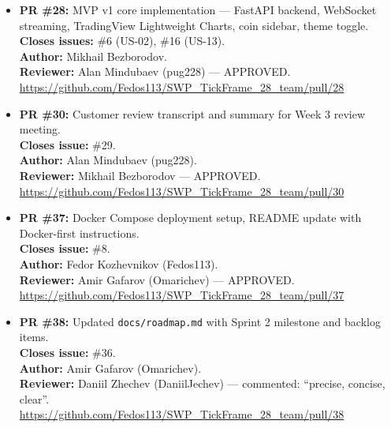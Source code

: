 \documentclass[11pt,a4paper]{article}
\begin{document}
\begin{itemize}[leftmargin=*]
    \item \textbf{PR \#28:} MVP v1 core implementation — FastAPI backend, WebSocket streaming, TradingView Lightweight Charts, coin sidebar, theme toggle. \\
          \textbf{Closes issues:} \#6 (US-02), \#16 (US-13). \\
          \textbf{Author:} Mikhail Bezborodov. \\
          \textbf{Reviewer:} Alan Mindubaev (pug228) — APPROVED. \\
          \url{https://github.com/Fedos113/SWP_TickFrame_28_team/pull/28}

    \item \textbf{PR \#30:} Customer review transcript and summary for Week 3 review meeting. \\
          \textbf{Closes issue:} \#29. \\
          \textbf{Author:} Alan Mindubaev (pug228). \\
          \textbf{Reviewer:} Mikhail Bezborodov — APPROVED. \\
          \url{https://github.com/Fedos113/SWP_TickFrame_28_team/pull/30}

    \item \textbf{PR \#37:} Docker Compose deployment setup, README update with Docker-first instructions. \\
          \textbf{Closes issue:} \#8. \\
          \textbf{Author:} Fedor Kozhevnikov (Fedos113). \\
          \textbf{Reviewer:} Amir Gafarov (Omarichev) — APPROVED. \\
          \url{https://github.com/Fedos113/SWP_TickFrame_28_team/pull/37}

    \item \textbf{PR \#38:} Updated \texttt{docs/roadmap.md} with Sprint 2 milestone and backlog items. \\
          \textbf{Closes issue:} \#36. \\
          \textbf{Author:} Amir Gafarov (Omarichev). \\
          \textbf{Reviewer:} Daniil Zhechev (DaniilJechev) — commented: ``precise, concise, clear''. \\
          \url{https://github.com/Fedos113/SWP_TickFrame_28_team/pull/38}
\end{itemize}

\end{document}

